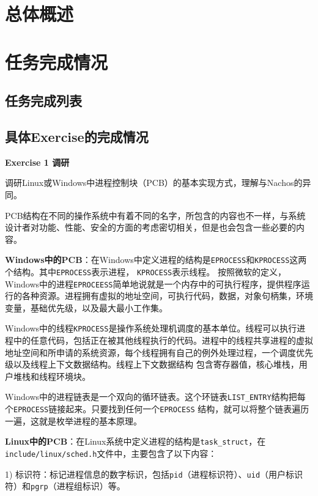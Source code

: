 \section{总体概述}

\section{任务完成情况}

\subsection{任务完成列表}

\subsection{具体Exercise的完成情况}

\textbf{Exercise 1 调研}

调研Linux或Windows中进程控制块（PCB）的基本实现方式，理解与Nachos的异同。

PCB结构在不同的操作系统中有着不同的名字，所包含的内容也不一样，与系统设计者对功能、性能、安全的方面的考虑密切相关，但是也会包含一些必要的内容。

\textbf{Windows中的PCB}：在Windows中定义进程的结构是\texttt{EPROCESS}和\texttt{KPROCESS}这两个结构。其中\texttt{EPROCESS}表示进程，
\texttt{KPROCESS}表示线程。
按照微软的定义， Windows中的进程\texttt{EPROCEESS}简单地说就是一个内存中的可执行程序，提供程序运行的各种资源。进程拥有虚拟的地址空间，可执行代码，数据，对象句柄集，环境变量，基础优先级，以及最大最小工作集。

Windows中的线程\texttt{KPROCESS}是操作系统处理机调度的基本单位。线程可以执行进程中的任意代码，包括正在被其他线程执行的代码。进程中的线程共享进程的虚拟地址空间和所申请的系统资源，每个线程拥有自己的例外处理过程，一个调度优先级以及线程上下文数据结构。线程上下文数据结构
包含寄存器值，核心堆栈，用户堆栈和线程环境块。

Windows中的进程链表是一个双向的循环链表。这个环链表\texttt{LIST\_ENTRY}结构把每个\texttt{EPROCESS}链接起来。只要找到任何一个\texttt{EPROCESS}
结构，就可以将整个链表遍历一遍，这就是枚举进程的基本原理。

\textbf{Linux中的PCB}：在Linux系统中定义进程的结构是\texttt{task\_struct}，在\texttt{include/linux/sched.h}文件中，主要包含了以下内容：

1) 标识符：标记进程信息的数字标识，包括\texttt{pid}（进程标识符）、\texttt{uid}（用户标识符）和\texttt{pgrp}（进程组标识）等。

